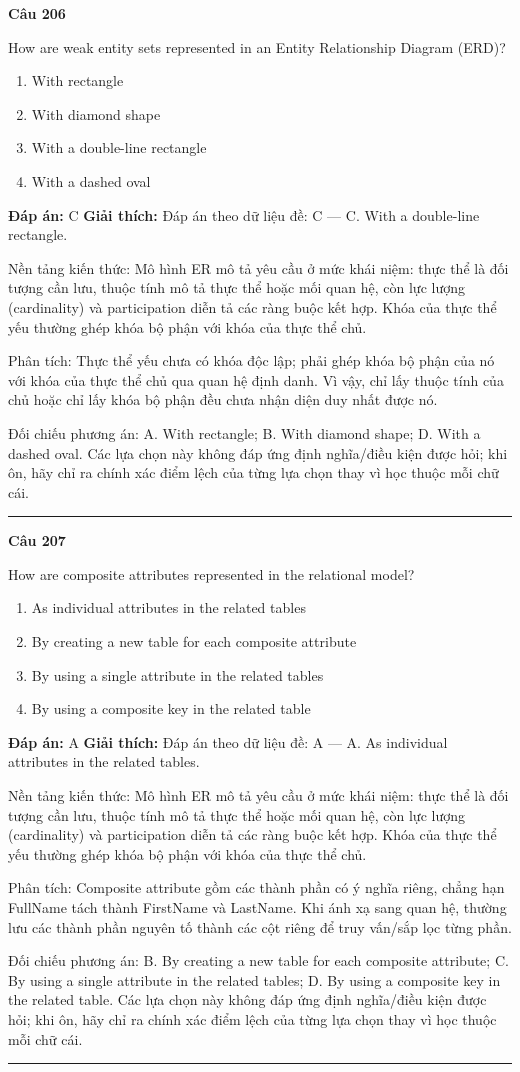 \documentclass[11pt,a4paper]{article}
\newenvironment{question}[1]{%
  \par\vspace{1em}\noindent\textbf{\large Câu #1}\par\vspace{0.4em}
}{%
  \par\vspace{1em}\hrule\vspace{0.6em}
}
\newenvironment{choices}{%
  \begin{enumerate}[label=\textbf{\Alph*.},leftmargin=2.2em,itemsep=2pt,topsep=3pt]
}{%
  \end{enumerate}
}
\newcommand{\choice}{\item}
\begin{document}
\begin{question}{206}
How are weak entity sets represented in an Entity Relationship Diagram (ERD)?
\begin{choices}
\choice With rectangle
\choice With diamond shape
\choice With a double-line rectangle
\choice With a dashed oval
\end{choices}
\textbf{Đáp án:} C
\textbf{Giải thích:} Đáp án theo dữ liệu đề: C — C. With a double-line rectangle.

Nền tảng kiến thức: Mô hình ER mô tả yêu cầu ở mức khái niệm: thực thể là đối tượng cần lưu, thuộc tính mô tả thực thể hoặc mối quan hệ, còn lực lượng (cardinality) và participation diễn tả các ràng buộc kết hợp. Khóa của thực thể yếu thường ghép khóa bộ phận với khóa của thực thể chủ.

Phân tích: Thực thể yếu chưa có khóa độc lập; phải ghép khóa bộ phận của nó với khóa của thực thể chủ qua quan hệ định danh. Vì vậy, chỉ lấy thuộc tính của chủ hoặc chỉ lấy khóa bộ phận đều chưa nhận diện duy nhất được nó.

Đối chiếu phương án: A. With rectangle; B. With diamond shape; D. With a dashed oval. Các lựa chọn này không đáp ứng định nghĩa/điều kiện được hỏi; khi ôn, hãy chỉ ra chính xác điểm lệch của từng lựa chọn thay vì học thuộc mỗi chữ cái.
\end{question}

\begin{question}{207}
How are composite attributes represented in the relational model?
\begin{choices}
\choice As individual attributes in the related tables
\choice By creating a new table for each composite attribute
\choice By using a single attribute in the related tables
\choice By using a composite key in the related table
\end{choices}
\textbf{Đáp án:} A
\textbf{Giải thích:} Đáp án theo dữ liệu đề: A — A. As individual attributes in the related tables.

Nền tảng kiến thức: Mô hình ER mô tả yêu cầu ở mức khái niệm: thực thể là đối tượng cần lưu, thuộc tính mô tả thực thể hoặc mối quan hệ, còn lực lượng (cardinality) và participation diễn tả các ràng buộc kết hợp. Khóa của thực thể yếu thường ghép khóa bộ phận với khóa của thực thể chủ.

Phân tích: Composite attribute gồm các thành phần có ý nghĩa riêng, chẳng hạn FullName tách thành FirstName và LastName. Khi ánh xạ sang quan hệ, thường lưu các thành phần nguyên tố thành các cột riêng để truy vấn/sắp lọc từng phần.

Đối chiếu phương án: B. By creating a new table for each composite attribute; C. By using a single attribute in the related tables; D. By using a composite key in the related table. Các lựa chọn này không đáp ứng định nghĩa/điều kiện được hỏi; khi ôn, hãy chỉ ra chính xác điểm lệch của từng lựa chọn thay vì học thuộc mỗi chữ cái.
\end{question}
\end{document}
